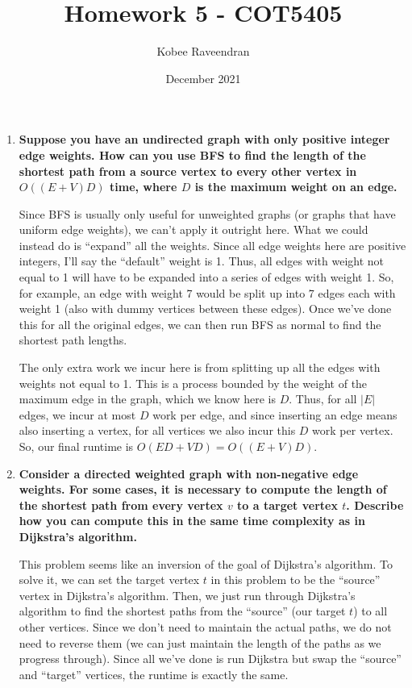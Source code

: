 \documentclass[12pt]{article}
\title{Homework 5 - COT5405}
\author{Kobee Raveendran}
\date{December 2021}
\begin{document}
    \maketitle

    \begin{enumerate}
        \item \textbf{Suppose you have an undirected graph with only positive integer edge weights. How can you use BFS to find 
        the length of the shortest path from a source vertex to every other vertex in $O((E+V)D)$ time, where $D$ is the 
        maximum weight on an edge.}

        Since BFS is usually only useful for unweighted graphs (or graphs that have uniform edge weights), we can't apply 
        it outright here. What we could instead do is ``expand'' all the weights. Since all edge weights here are 
        positive integers, I'll say the ``default'' weight is 1. Thus, all edges with weight not equal to 1 will have 
        to be expanded into a series of edges with weight 1. So, for example, an edge with weight 7 would be split up 
        into 7 edges each with weight 1 (also with dummy vertices between these edges). Once we've done this for all the 
        original edges, we can then run BFS as normal to find the shortest path lengths.

        The only extra work we incur here is from splitting up all the edges with weights not equal to 1. This is a 
        process bounded by the weight of the maximum edge in the graph, which we know here is $D$. Thus, for all $|E|$ edges, we incur at 
        most $D$ work per edge, and since inserting an edge means also inserting a vertex, for all vertices we also incur 
        this $D$ work per vertex. So, our final runtime is $O(ED + VD) = O((E + V)D)$.

        \item \textbf{Consider a directed weighted graph with non-negative edge weights. For some cases, it is necessary 
        to compute the length of the shortest path from every vertex $v$ to a target vertex $t$. Describe how you can 
        compute this in the same time complexity as in Dijkstra's algorithm.}

        This problem seems like an inversion of the goal of Dijkstra's algorithm. To solve it, we can set the 
        target vertex $t$ in this problem to be the ``source'' vertex in Dijkstra's algorithm. Then, we just run through 
        Dijkstra's algorithm to find the shortest paths from the ``source'' (our target $t$) to all other vertices. 
        Since we don't need to maintain the actual paths, we do not need to reverse them (we can just maintain the length 
        of the paths as we progress through). Since all we've done is run Dijkstra but swap the ``source'' and ``target'' 
        vertices, the runtime is exactly the same.


\end{enumerate}
\end{document}
